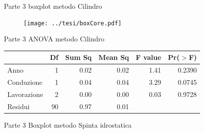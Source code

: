 \documentclass[10pt]{beamer}
\begin{document}
\begin{frame}
\end{frame}


\begin{frame}[label=Core]{Parte 3 \small{boxplot metodo Cilindro}}
  \hyperlink{finale}{}  
  \begin{figure}
    \texttt{[image: ../tesi/boxCore.pdf]}
  \end{figure}
\end{frame}

\begin{frame}{Parte 3 \small{ ANOVA metodo  Cilindro} }
  \begin{table}[ht]
    \centering
    \label{tab:anova del modello}
    \begin{tabular}{lrrrrr}
      \hline
      & Df & Sum Sq & Mean Sq & F value & Pr($>$F) \\ 
      \hline 
      Anno         & 1  &  0.02  &  0.02  &   1.41   & 0.2390   \\ 
      Conduzione   & 1  &  0.04  &  0.04  &   3.29   & 0.0745   \\ 
      Lavorazione  & 2  &  0.00  &  0.00  &   0.03   & 0.9728   \\ 
      Residui      & 90 &  0.97  &  0.01  &          &          \\ 
      \hline
    \end{tabular}
  \end{table}
\end{frame}

\begin{frame}[label=Clod]{Parte 3 \small{Boxplot metodo Spinta
      idrostatica}} 
  \hyperlink{finale}{}
\end{frame}
\end{document}
